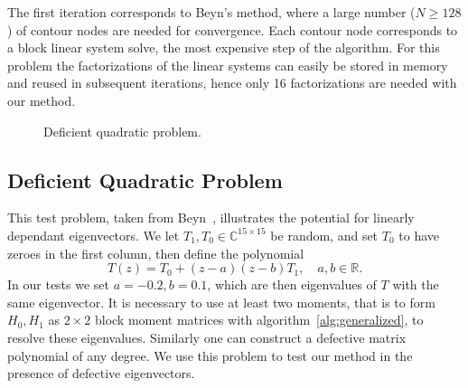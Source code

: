 \documentclass[onefignum,onetabnum]{siamart190516}
\begin{document}
The first iteration corresponds to Beyn's method, where a large number (\(N\ge128\)) of contour nodes are needed for convergence.
Each contour node corresponds to a block linear system solve, the most expensive step of the algorithm.
For this problem the factorizations of the linear systems can easily be stored in memory and reused in subsequent iterations, hence only 16 factorizations are needed with our method.

\begin{figure}[htbp]
	\centering
	\caption{Deficient quadratic problem.}\label{fig:quadratic}
\end{figure}

\subsection{Deficient Quadratic Problem}
This test problem, taken from Beyn~\cite{beyn2012}, illustrates the potential for linearly dependant eigenvectors.
We let \(T_1, T_0 \in \mathbb{C}^{15\times15}\) be random, and set \(T_0\) to have zeroes in the first column, then define the polynomial
\begin{equation}
    T(z) = T_0 + (z-a)(z-b)T_1, \quad a,b \in \mathbb{R}.
\end{equation}
In our tests we set \(a=-0.2, b=0.1\), which are then eigenvalues of \(T\) with the same eigenvector.
It is necessary to use at least two moments, that is to form \(H_0, H_1\) as \(2\times 2\) block moment matrices with algorithm~\ref{alg:generalized}, to resolve these eigenvalues. 
Similarly one can construct a defective matrix polynomial of any degree. 
We use this problem to test our method in the presence of defective eigenvectors.
\end{document}
